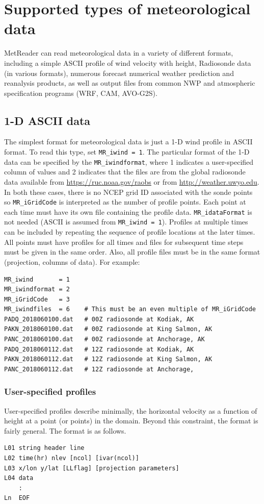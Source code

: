 \documentclass[11pt]{article}   %
\begin{document}
\section{Supported types of meteorological data}
MetReader can read meteorological data in a variety of different formats, including
a simple ASCII profile of wind velocity with height, Radiosonde data (in various formats),
numerous forecast numerical weather prediction and reanalysis products, as well as output
files from common NWP and atmospheric specification programs (WRF, CAM, AVO-G2S).
\subsection{1-D ASCII data}
The simplest format for meteorological data is just a 1-D wind profile in ASCII
format.  To read this type, set \texttt{MR\_iwind = 1}.  The particular format
of the 1-D data can be specified by the \texttt{MR\_iwindformat}, where 1 indicates a
user-specified column of values and 2 indicates that the files are from 
the global radiosonde data available from \url{https://ruc.noaa.gov/raobs} or
from \url{http://weather.uwyo.edu}.
In both these cases, there is no NCEP grid ID associated with the sonde points so
\texttt{MR\_iGridCode} is interpreted as the number of profile points.  Each point at each
time must have its own file containing the profile data.
\texttt{MR\_idataFormat} is not needed (ASCII is assumed from \texttt{MR\_iwind = 1}).
Profiles at multiple times can be included by repeating the sequence of profile
locations at the later times.  All points must have profiles for all times and files
for subsequent time steps must be given in the same order.
Also, all profile files must be in the same format (projection, columns of data).
For example:

\small
\begin{verbatim}
MR_iwind       = 1
MR_iwindformat = 2
MR_iGridCode   = 3
MR_iwindfiles  = 6    # This must be an even multiple of MR_iGridCode
PADQ_2018060100.dat   # 00Z radiosonde at Kodiak, AK
PAKN_2018060100.dat   # 00Z radiosonde at King Salmon, AK
PANC_2018060100.dat   # 00Z radiosonde at Anchorage, AK
PADQ_2018060112.dat   # 12Z radiosonde at Kodiak, AK
PAKN_2018060112.dat   # 12Z radiosonde at King Salmon, AK
PANC_2018060112.dat   # 12Z radiosonde at Anchorage, 
\end{verbatim}
\normalsize

\subsubsection{User-specified profiles}
User-specified profiles describe minimally, the horizontal velocity as a function
of height at a point (or points) in the domain.  Beyond this constraint,
the format is fairly
general.  The format is as follows.
\small
\begin{verbatim}
L01 string header line
L02 time(hr) nlev [ncol] [ivar(ncol)]
L03 x/lon y/lat [LLflag] [projection parameters]
L04 data
    :
Ln  EOF
\end{verbatim}
\normalsize
\end{document}
